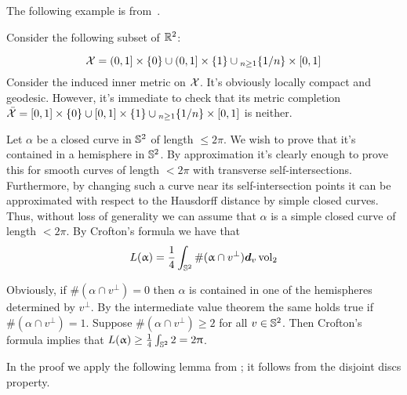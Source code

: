 The following example is from~\cite{BH}.

Consider the following subset of $\mathbb{R}^2$:

\[
\spc{X}=(0,1]\times\{0\}\cup (0,1]\times\{1\}\cup_{n\ge 1}\{1/n\}\times[0,1]
\]
Consider the induced inner metric on $\mathcal{X}$. It's obviously locally compact and geodesic.
However, it's immediate to check that its metric completion $\bar{\spc{X}}=[0,1]\times\{0\}\cup [0,1]\times\{1\}\cup_{n\ge 1}\{1/n\}\times[0,1]$ is neither. \qeds 

Let $\alpha$ be a closed curve in  $\mathbb{S}^2$ of length $\le 2\pi$.  We wish to prove that it's contained in a hemisphere in $\mathbb{S}^2$.
By approximation it's clearly enough to prove this for  smooth curves of length $< 2\pi$ with transverse self-intersections. Furthermore, by changing such  a curve near its self-intersection points  it can be approximated with respect to the Hausdorff distance by simple closed curves. 
Thus, without loss of generality we can assume that $\alpha$ is a simple closed curve of length $<2\pi$.
By Crofton's formula we have that
\[
L(\alpha)=\frac 1 4 \int _{\SS^2}\#(\alpha\cap v^\perp) \d_v\vol_2
\]

Obviously,  if $\#(\alpha\cap v^\perp) =0$ then $\alpha$ is contained in one of the hemispheres determined by $v^\perp$. By the intermediate value theorem the same holds true if $\#(\alpha\cap v^\perp) =1$.
Suppose  $\#(\alpha\cap v^\perp) \ge 2$ for all $v\in\SS^2$. Then Crofton's formula implies that
$L(\alpha)\ge \frac 1 4 \int_{\SS^2}2=2\pi$. \qeds

In the proof we apply the following lemma from \cite{edwards}; 
it follows from the disjoint discs property.


